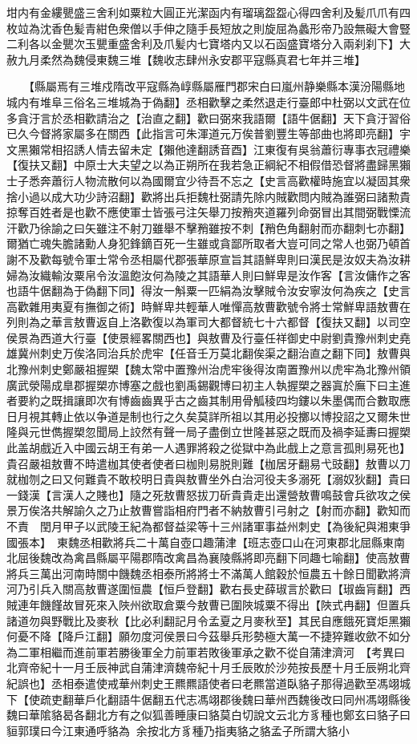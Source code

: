 坩内有金縷甖盛三舍利如粟粒大圓正光潔函内有瑠璃盌盌心得四舍利及髪爪爪有四枚竝為沈香色髪青紺色衆僧以手伸之隨手長短放之則旋屈為蠡形帝乃設無礙大會豎二利各以金甖次玉甖重盛舍利及爪髪内七寶塔内又以石函盛寶塔分入兩刹刹下】大赦九月柔然為魏侵東魏三堆【魏收志肆州永安郡平寇縣真君七年并三堆】

　　【縣屬焉有三堆戍隋改平寇縣為崞縣屬雁門郡宋白曰嵐州静樂縣本漢汾陽縣地城内有堆阜三俗名三堆城為于偽翻】丞相歡擊之柔然退走行臺郎中杜弼以文武在位多貪汙言於丞相歡請治之【治直之翻】歡曰弼來我語爾【語牛倨翻】天下貪汙習俗已久今督將家屬多在關西【此指言可朱渾道元万俟普劉豐生等部曲也將即亮翻】宇文黑獺常相招誘人情去留未定【獺他達翻誘音酉】江東復有吳翁蕭衍專事衣冠禮樂【復扶又翻】中原士大夫望之以為正朔所在我若急正綱紀不相假借恐督將盡歸黑獺士子悉奔蕭衍人物流散何以為國爾宜少待吾不忘之【史言高歡權時施宜以凝固其衆捨小過以成大功少詩沼翻】歡將出兵拒魏杜弼請先除内賊歡問内賊為誰弼曰諸勲貴掠奪百姓者是也歡不應使軍士皆張弓注矢舉刀按矟夾道羅列命弼冒出其間弼戰慄流汗歡乃徐諭之曰矢雖注不射刀雖舉不擊矟雖按不刺【矟色角翻射而亦翻刺七亦翻】爾猶亡魂失膽諸勳人身犯鋒鏑百死一生雖或貪鄙所取者大豈可同之常人也弼乃頓首謝不及歡每號令軍士常令丞相屬代郡張華原宣旨其語鮮卑則曰漢民是汝奴夫為汝耕婦為汝織輸汝粟帛令汝溫飽汝何為陵之其語華人則曰鮮卑是汝作客【言汝傭作之客也語牛倨翻為于偽翻下同】得汝一斛粟一匹絹為汝擊賊令汝安寧汝何為疾之【史言高歡雜用夷夏有撫御之術】時鮮卑共輕華人唯憚高敖曹歡號令將士常鮮卑語敖曹在列則為之華言敖曹返自上洛歡復以為軍司大都督統七十六都督【復扶又翻】以司空侯景為西道大行臺【使景經畧關西也】與敖曹及行臺任祥御史中尉劉貴豫州刺史堯雄冀州刺史万俟洛同治兵於虎牢【任音壬万莫北翻俟渠之翻治直之翻下同】敖曹與北豫州刺史鄭嚴祖握槊【魏太常中置豫州治虎牢後得汝南置豫州以虎牢為北豫州領廣武滎陽成臯郡握槊亦博塞之戲也劉禹錫觀博曰初主人執握槊之器寘於廡下曰主進者要約之既揖讓即次有博齒齒異乎古之齒其制用骨觚稜四均鏤以朱墨偶而合數取應日月視其轉止依以争道是制也行之久矣莫詳所祖以其用必投擲以博投詔之又爾朱世隆與元世儁握槊忽聞局上詨然有聲一局子盡倒立世隆甚惡之既而及禍李延夀曰握槊此盖胡戲近入中國云胡王有弟一人遇罪將殺之從獄中為此戲上之意言孤則易死也】貴召嚴祖敖曹不時遣枷其使者使者曰枷則易脱則難【枷居牙翻易弋豉翻】敖曹以刀就枷刎之曰又何難貴不敢校明日貴與敖曹坐外白治河役夫多溺死【溺奴狄翻】貴曰一錢漢【言漢人之賤也】隨之死敖曹怒拔刀斫貴貴走出還營敖曹鳴鼓會兵欲攻之侯景万俟洛共解諭久之乃止敖曹嘗詣相府門者不納敖曹引弓射之【射而亦翻】歡知而不責　閏月甲子以武陵王紀為都督益梁等十三州諸軍事益州刺史【為後紀與湘東爭國張本】　東魏丞相歡將兵二十萬自壺口趣蒲津【班志壺口山在河東郡北屈縣東南北屈後魏改為禽昌縣屬平陽郡隋改禽昌為襄陵縣將即亮翻下同趣七喻翻】使高敖曹將兵三萬出河南時關中饑魏丞相泰所將將士不滿萬人館穀於恒農五十餘日聞歡將濟河乃引兵入關高敖曹遂圍恒農【恒戶登翻】歡右長史薛琡言於歡曰【琡齒肓翻】西賊連年饑饉故冒死來入陜州欲取倉粟今敖曹已圍陜城粟不得出【陜式冉翻】但置兵諸道勿與野戰比及麥秋【比必利翻記月令孟夏之月麥秋至】其民自應餓死寶炬黑獺何憂不降【降戶江翻】願勿度河侯景曰今茲舉兵形勢極大萬一不捷猝難收歛不如分為二軍相繼而進前軍若勝後軍全力前軍若敗後軍承之歡不從自蒲津濟河　【考異曰北齊帝紀十一月壬辰神武自蒲津濟魏帝紀十月壬辰敗於沙苑按長歷十月壬辰朔北齊紀誤也】丞相泰遣使戒華州刺史王羆羆語使者曰老羆當道臥貉子那得過歡至馮翊城下【使疏吏翻華戶化翻語牛倨翻五代志馮翊郡後魏曰華州西魏後改曰同州馮翊縣後魏曰華隂貉曷各翻北方有之似狐善睡康曰貉莫白切說文云北方豸種也鄭玄曰貉子曰貆郭璞曰今江東通呼貉為余按北方豸種乃指夷貉之貉孟子所謂大貉小